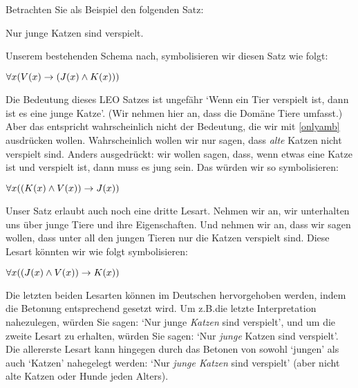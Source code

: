 Betrachten Sie als Beispiel den folgenden Satz:
\begin{earg}
	\item[\ex{onlyamb}] Nur junge Katzen sind verspielt.
\end{earg} 
Unserem bestehenden Schema nach, symbolisieren wir diesen Satz wie folgt:
\begin{earg}
	\item[] $\forall x(\mathord{V}(x) \rightarrow (\mathord{J}(x) \wedge \mathord{K}(x)))$ %
\end{earg}
Die Bedeutung dieses LEO Satzes ist ungefähr `Wenn ein Tier verspielt ist, dann ist es eine junge Katze'. (Wir nehmen hier an, dass die Domäne Tiere umfasst.) Aber das entspricht wahrscheinlich nicht der Bedeutung, die wir mit \ref{onlyamb} ausdrücken wollen. Wahrscheinlich wollen wir nur sagen, dass \emph{alte} Katzen nicht verspielt sind. Anders ausgedrückt: wir wollen sagen, dass, wenn etwas eine Katze ist und verspielt ist, dann muss es jung sein. Das würden wir so symbolisieren:
\begin{earg}
	\item[] $\forall x((\mathord{K}(x) \wedge \mathord{V}(x)) \rightarrow \mathord{J}(x))$ 
\end{earg}
Unser Satz erlaubt auch noch eine dritte Lesart. Nehmen wir an, wir unterhalten uns über junge Tiere und ihre Eigenschaften. Und nehmen wir an, dass wir sagen wollen, dass unter all den jungen Tieren nur die Katzen verspielt sind. Diese Lesart könnten wir wie folgt symbolisieren:
\begin{earg}
	\item[] $\forall x((\mathord{J}(x) \wedge \mathord{V}(x)) \rightarrow \mathord{K}(x))$ 
\end{earg}
Die letzten beiden Lesarten können im Deutschen hervorgehoben werden, indem die Betonung entsprechend gesetzt wird. Um z.B.\@ die letzte Interpretation nahezulegen, würden Sie sagen: `Nur junge \emph{Katzen} sind verspielt', und um die zweite Lesart zu erhalten, würden Sie sagen: `Nur \emph{junge} Katzen sind verspielt'.  Die allererste Lesart kann hingegen durch das Betonen von sowohl `jungen' als auch `Katzen' nahegelegt werden: `Nur \emph{junge Katzen} sind verspielt' (aber nicht alte Katzen oder Hunde jeden Alters).

